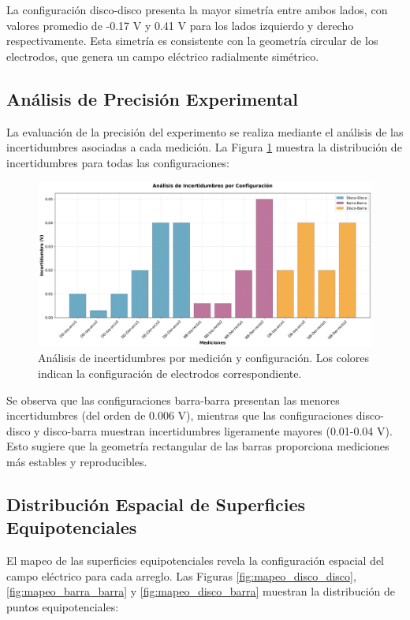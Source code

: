 \documentclass[11pt,twocolumn]{article}
\begin{document}
La configuración disco-disco presenta la mayor simetría entre ambos lados, con valores promedio de -0.17 V y 0.41 V para los lados izquierdo y derecho respectivamente. Esta simetría es consistente con la geometría circular de los electrodos, que genera un campo eléctrico radialmente simétrico.

\subsection{Análisis de Precisión Experimental}

La evaluación de la precisión del experimento se realiza mediante el análisis de las incertidumbres asociadas a cada medición. La Figura \ref{fig:incertidumbres} muestra la distribución de incertidumbres para todas las configuraciones:

\begin{figure}[h]
\centering
\includegraphics[width=0.9\columnwidth]{graficas/analisis_incertidumbres.png}
\caption{Análisis de incertidumbres por medición y configuración. Los colores indican la configuración de electrodos correspondiente.}
\label{fig:incertidumbres}
\end{figure}

Se observa que las configuraciones barra-barra presentan las menores incertidumbres (del orden de 0.006 V), mientras que las configuraciones disco-disco y disco-barra muestran incertidumbres ligeramente mayores (0.01-0.04 V). Esto sugiere que la geometría rectangular de las barras proporciona mediciones más estables y reproducibles.

\subsection{Distribución Espacial de Superficies Equipotenciales}

El mapeo de las superficies equipotenciales revela la configuración espacial del campo eléctrico para cada arreglo. Las Figuras \ref{fig:mapeo_disco_disco}, \ref{fig:mapeo_barra_barra} y \ref{fig:mapeo_disco_barra} muestran la distribución de puntos equipotenciales:
\end{document}
